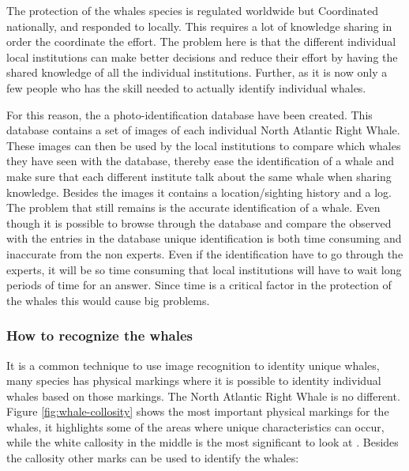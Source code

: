 The protection of the whales species is regulated worldwide but Coordinated nationally, and responded to locally. This requires a lot of knowledge sharing in order the coordinate the effort. The problem here is that the different individual local institutions can make better decisions and reduce their effort by having the shared knowledge of all the individual institutions.
Further, as it is now only a few people who has the skill needed to actually identify individual whales.

For this reason, the a photo-identification database have been created. This database contains a set of images of each individual North Atlantic Right Whale. 
These images can then be used by the local institutions to compare which whales they have seen with the database, thereby ease the identification of a whale and make sure that each different institute talk about the same whale when sharing knowledge. Besides the images it contains a location/sighting history and a log.
The problem that still remains is the accurate identification of a whale. Even though it is possible to browse through the database and compare the observed with the entries in the database unique identification is both time consuming and inaccurate from the non experts.
Even if the identification have to go through the experts, it will be so time consuming that local institutions will have to wait long periods of time for an answer.
Since time is a critical factor in the protection of the whales this would cause big problems.

\subsubsection{How to recognize the whales}
It is a common technique to use image recognition to identity unique whales, many species has physical markings where it is possible to identity individual whales based on those markings. The North Atlantic Right Whale is no different. Figure \ref{fig:whale-collosity} shows the most important physical markings for the whales, it highlights some of the areas where unique characteristics can occur, while the white callosity in the middle is the most significant to look at \cite{neaq:whale-identity}. Besides the callosity other marks can be used to identify the whales:

